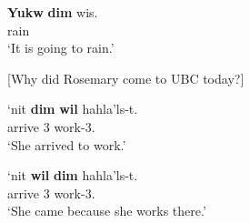 \documentclass[output=paper]{langscibook}
\begin{document}
\begin{exe}
\ex \label{Todoro50}
\gll \textbf{{Yukw}} 	\textbf{{dim}} 	{wis}.  \\
   rain \\
\glt `It is going to rain.' 
\end{exe}

\begin{exe}
\ex \label{Todoro51} [{Why did Rosemary come to UBC today?}] 
\begin{xlist}

\ex \label{Todoro51a}
	{‘nit}	  \textbf{{dim}}	\textbf{{wil}}	{hahla’ls-t}. \\
    arrive	3   		work-3.{\seriesII}\\
\glt `She arrived to work.' 

\ex \label{Todoro51b}
	{‘nit}	     \textbf{{wil}}	\textbf{{dim}} 	{hahla’ls-t}. \\
    arrive	3     		work-3.{\seriesII}\\
\glt `She came because she works there.' 

\end{xlist}
\end{exe}

\begin{comment}
\newpage

\section*{Abbreviations}
\begin{tabularx}{.45\textwidth}{lQ}
... & \\
... & \\
\end{tabularx}
\begin{tabularx}{.45\textwidth}{lQ}
... & \\
... & \\
\end{tabularx}
\end{comment}
\end{document}
